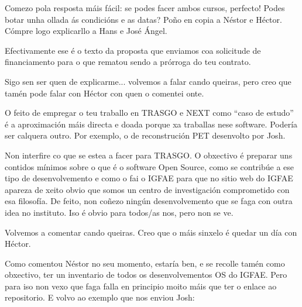 \documentclass[a4paper]{article}
\begin{document}





Comezo pola resposta máis fácil: se podes facer ambos cursos, perfecto! Podes botar unha ollada ás condicións e as datas? Poño en copia a Néstor e Héctor. Cómpre logo explicarllo a Hans e José Ángel.

 

Efectivamente ese é o texto da proposta que enviamos coa solicitude de financiamento para o que rematou sendo a prórroga do teu contrato.

 

Sigo sen ser quen de explicarme... volvemos a falar cando queiras, pero creo que tamén pode falar con Héctor con quen o comentei onte.

 

O feito de empregar o teu traballo en TRASGO e NEXT como “caso de estudo” é a aproximación máis directa e doada porque xa traballas nese software. Podería ser calquera outro. Por exemplo, o de reconstrución PET desenvolto por Josh.

 

Non interfire co que se estea a facer para TRASGO. O obxectivo é preparar uns contidos mínimos sobre o que é o software Open Source, como se contribúe a ese tipo de desenvolvemento e como o fai o IGFAE para que no sitio web do IGFAE apareza de xeito obvio que somos un centro de investigación comprometido con esa filosofía. De feito, non coñezo ningún desenvolvemento que se faga con outra idea no instituto. Iso é obvio para todos/as nos, pero non se ve.

 

Volvemos a comentar cando queiras. Creo que o máis sinxelo é quedar un día con Héctor.

 

Como comentou Néstor no seu momento, estaría ben, e se recolle tamén como obxectivo, ter un inventario de todos os desenvolvementos OS do IGFAE. Pero para iso non vexo que faga falla en principio moito máis que ter o enlace ao repositorio. E volvo ao exemplo que nos enviou Josh:
\end{document}

